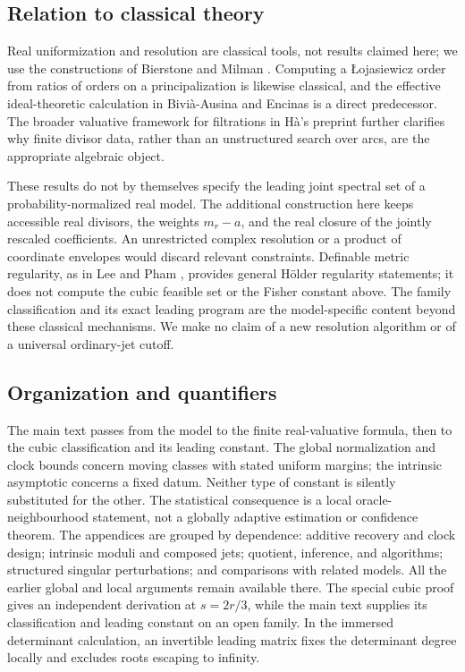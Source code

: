 \documentclass[11pt,reqno]{amsart}
\numberwithin{equation}{section}
\theoremstyle{definition}\newtheorem{definition}[theorem]{Definition}
\theoremstyle{remark}\newtheorem{remark}[theorem]{Remark}
\begin{document}
\subsection*{Relation to classical theory}
Real uniformization and resolution are classical tools, not results
claimed here; we use the constructions of Bierstone and Milman
\cite{v95BM88,v95BM97}. Computing a \L{}ojasiewicz order from ratios of
orders on a principalization is likewise classical, and the effective
ideal-theoretic calculation in Bivi\`a-Ausina and Encinas
\cite{v95BE09} is a direct predecessor. The broader valuative framework
for filtrations in H\`a's preprint \cite{v95Ha26} further clarifies why
finite divisor data, rather than an unstructured search over arcs,
are the appropriate algebraic object.

These results do not by themselves specify the leading joint spectral
set of a probability-normalized real model. The additional construction
here keeps accessible real divisors, the weights $m_r-a$, and the real
closure of the jointly rescaled coefficients. An unrestricted complex
resolution or a product of coordinate envelopes would discard relevant
constraints. Definable metric regularity, as in Lee and Pham
\cite{v95LP20}, provides general H\"older regularity statements; it does
not compute the cubic feasible set or the Fisher constant above.
The family classification and its exact leading program are the
model-specific content beyond these classical mechanisms. We make no
claim of a new resolution algorithm or of a universal ordinary-jet cutoff.

\subsection*{Organization and quantifiers}
The main text passes from the model to the finite real-valuative formula,
then to the cubic classification and its leading constant. The global
normalization and clock bounds concern moving classes with stated
uniform margins; the intrinsic asymptotic concerns a fixed datum.
Neither type of constant is silently substituted for the other.
The statistical consequence is a local oracle-neighbourhood statement,
not a globally adaptive estimation or confidence theorem.
\ifdefined\AIIcoreonly\else
The appendices are grouped by dependence: additive recovery and clock
design; intrinsic moduli and composed jets; quotient, inference, and
algorithms; structured singular perturbations; and comparisons with
related models. All the earlier global and local arguments remain
available there. The special cubic proof gives an independent derivation
at $s=2r/3$, while the main text supplies its classification and leading
constant on an open family. In the immersed determinant calculation,
an invertible leading matrix fixes the determinant degree locally and
excludes roots escaping to infinity.
\fi
\end{document}
